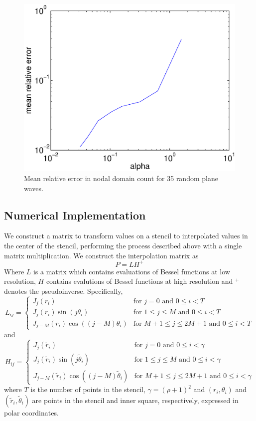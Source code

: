 \documentclass{report}
\begin{document}
\begin{figure}
  \begin{center}
    \includegraphics[width=\textwidth]{figs/interpolation/rpw_mean_relative_count_error.eps}
    \caption{Mean relative error in nodal domain count for 35 random plane waves.}
    \label{fig:rpw_count_errors}
  \end{center}
\end{figure}

\subsection{Numerical Implementation}
We construct a matrix to transform values on a stencil to interpolated values in the center of the stencil, performing the process described above with a single matrix multiplication. We construct the interpolation matrix as
\[
P = L H^{+}
\]
Where $L$ is a matrix which contains evaluations of Bessel functions at low resolution, $H$ contains evalutions of Bessel functions at high resolution and $^{+}$ denotes the pseudoinverse. Specifically,
\[
L_{ij} =\begin{cases}
J_{j}(r_{i}) & \text{for } j = 0 \text{ and } 0 \le i < T\\
J_{j}(r_{i}) \sin{(j \theta_{i})} & \text{for } 1 \le j \le M \text{ and } 0 \le i < T\\
J_{j-M}(r_{i}) \cos{((j-M) \theta_{i})} & \text{for } M+1 \le j \le 2M+1 \text{ and } 0 \le i < T
\end{cases}
\]
and
\[
H_{ij} =\begin{cases}
J_{j}(\tilde{r}_{i}) & \text{for } j = 0 \text{ and } 0 \le i < \gamma\\
J_{j}(\tilde{r}_{i}) \sin{(j \tilde{\theta}_{i})} & \text{for } 1 \le j \le M \text{ and } 0 \le i < \gamma\\
J_{j-M}(\tilde{r}_{i}) \cos{((j-M) \tilde{\theta}_{i})} & \text{for } M+1 \le j \le 2M+1 \text{ and } 0 \le i < \gamma
\end{cases}
\]
where $T$ is the number of points in the stencil, $\gamma = (\rho + 1)^{2}$ and $(r_{i},\theta_{i})$ and $(\tilde{r}_{i},\tilde{\theta}_{i})$ are points in the stencil and inner square, respectively, expressed in polar coordinates.
\end{document}
